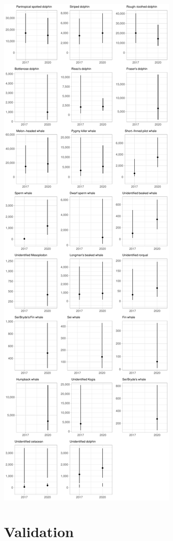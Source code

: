 \documentclass[
]{book}
\begin{document}
\includegraphics{figures/unnamed-chunk-378-1.pdf}

\hypertarget{validation-1}{%
\section*{Validation}\label{validation-1}}
\end{document}
